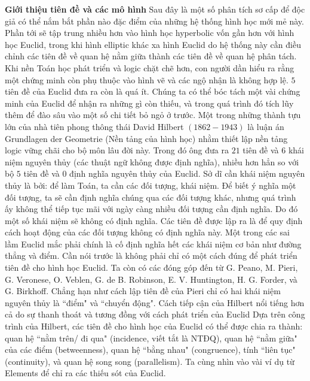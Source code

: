 \begin{multicols}{2}
	\vskip 0.1cm
	\textbf{\color{lichsutoanhoc}Giới thiệu tiên đề và các mô hình}
	\vskip 0.1cm
	Sau đây là một số phân tích sơ cấp để độc giả có thể nắm bắt phần nào đặc điểm của những hệ thống hình học mới mẻ này. Phần tới sẽ tập trung nhiều hơn vào hình học hyperbolic vốn gần hơn với hình học Euclid, trong khi hình elliptic khác xa hình Euclid do hệ thống này cần điều chỉnh các tiên đề về quan hệ nằm giữa thành các tiên đề về quan hệ phân tách.  
	\vskip 0.1cm
	Khi nền Toán học phát triển và logic chặt chẽ hơn, con người dần hiểu ra rằng một chứng minh còn phụ thuộc vào hình vẽ và các ngộ nhận là không hợp lệ. $5$ tiên đề của Euclid đưa ra còn là quá ít. Chúng ta có thể bóc tách một vài chứng minh của Euclid để nhận ra những gì còn thiếu, và trong quá trình đó tích lũy thêm để đào sâu vào một số chi tiết bỏ ngỏ ở trước. 
	\vskip 0.1cm
	Một trong những thành tựu lớn của nhà tiên phong thông thái David Hilbert $(1862-1943)$ là luận án Grundlagen der Geometrie (Nền tảng của hình học) nhằm thiết lập nền tảng logic vững chãi cho bộ môn lâu đời này. Trong đó ông đưa ra $21$ tiên đề và $6$ khái niệm nguyên thủy (các thuật ngữ không được định nghĩa), nhiều hơn hẳn so với bộ $5$ tiên đề và $0$ định nghĩa nguyên thủy của Euclid.
	\vskip 0.1cm
	Sở dĩ cần khái niệm nguyên thủy là bởi: để làm Toán, ta cần các đối tượng, khái niệm. Để biết ý nghĩa một đối tượng, ta sẽ cần định nghĩa chúng qua các đối tượng khác, nhưng quá trình ấy không thể tiếp tục mãi với ngày càng nhiều đối tượng cần định nghĩa. Do đó một số khái niệm sẽ không có định nghĩa. Các tiên đề được lập ra là để quy định cách hoạt động của các đối tượng không có định nghĩa này. Một trong các sai lầm Euclid mắc phải chính là cố định nghĩa hết các khái niệm cơ bản như đường thẳng và điểm.
	\vskip 0.1cm
	Cần nói trước là không phải chỉ có một cách đúng để phát triển tiên đề cho hình học Euclid. Ta còn có các đóng góp đến từ G. Peano, M. Pieri, G. Veronese, O. Veblen, G. de B. Robinson, E. V. Huntington, H. G. Forder, và G. Birkhoff. Chẳng hạn như cách lập tiên đề của Pieri chỉ có hai khái niệm nguyên thủy là ``điểm" và ``chuyển động". Cách tiếp cận của Hilbert nổi tiếng hơn cả do sự thanh thoát và tương đồng với cách phát triển của Euclid
	\vskip 0.1cm
	Dựa trên công trình của Hilbert, các tiên đề cho hình học của Euclid có thể được chia ra thành: quan hệ ``nằm trên/ đi qua" (incidence, viết tắt là NTĐQ), quan hệ ``nằm giữa" của các điểm (betweenness), quan hệ ``bằng nhau" (congruence), tính ``liên tục" (continuity), và quan hệ song song (parallelism). 
	\vskip 0.1cm
	Ta cùng nhìn vào vài ví dụ từ Elements để chỉ ra các thiếu sót của Euclid. 

\end{multicols}
